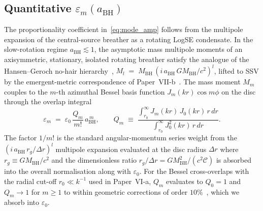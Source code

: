 \documentclass[11pt,a4paper]{article}
\begin{document}
\subsection{Quantitative $\varepsilon_m(a_\mathrm{BH})$}
\label{sec:eps_quant}

The proportionality coefficient in~\eqref{eq:mode_amp} follows from the
multipole expansion of the central-source breather as a rotating LogSE
condensate.  In the slow-rotation regime $a_\mathrm{BH}\lesssim1$, the
asymptotic mass multipole moments of an axisymmetric, stationary, isolated
rotating breather satisfy the analogue of the Hansen--Geroch no-hair
hierarchy~\cite{hansen1974}, $M_l \;=\; M_\mathrm{BH}\,(i\,a_\mathrm{BH}\,
GM_\mathrm{BH}/c^2)^l$, lifted to SSV by the emergent-metric correspondence of
Paper~VII-b~\cite{SSV-VIIb}.  The mass moment $M_m$ couples to the $m$-th
azimuthal Bessel basis function $J_m(kr)\cos m\phi$ on the disc through the
overlap integral
\begin{equation}
  \varepsilon_m \;=\; \varepsilon_0\,\frac{Q_m}{m!}\,a_\mathrm{BH}^{\,m},
  \qquad
  Q_m \;\equiv\; \frac{\int_{r_0}^\infty J_m(kr)\,J_0(kr)\,r\,dr}
                       {\int_{r_0}^\infty J_0^2(kr)\,r\,dr}.
  \label{eq:eps_quant}
\end{equation}
The factor $1/m!$ is the standard angular-momentum series weight from the
$(i\,a_\mathrm{BH}\,r_g/\Delta r)^l$ multipole expansion evaluated at the disc
radius $\Delta r$ where $r_g\equiv GM_\mathrm{BH}/c^2$ and the dimensionless
ratio $r_g/\Delta r = GM_\mathrm{BH}^2/(c^2\mathcal{C})$ is absorbed into the
overall normalisation along with $\varepsilon_0$.  For the Bessel cross-overlaps
with the radial cut-off $r_0\ll k^{-1}$ used in Paper~VI-a, $Q_m$ evaluates to
$Q_0=1$ and $Q_m \to 1$ for $m\geq1$ to within geometric corrections of order
$10\%$~\cite{abramowitz1972}, which we absorb into $\varepsilon_0$.
\end{document}

